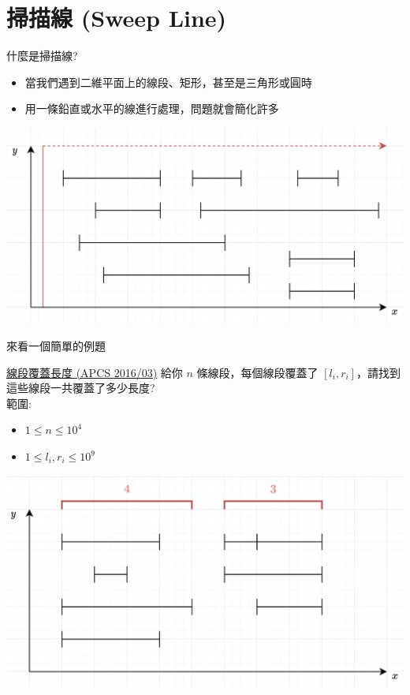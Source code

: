 \documentclass[aspectratio=169]{beamer}
\begin{document}
    \section{掃描線 (Sweep Line)}
    
    \begin{frame}{什麼是掃描線?}
        \begin{itemize}
            \item 當我們遇到二維平面上的線段、矩形，甚至是三角形或圓時
            \item 用一條鉛直或水平的線進行處理，問題就會簡化許多
        \end{itemize}
        \begin{center}
            \includegraphics[scale=0.4]{images/sweep_line.png}
        \end{center}
    \end{frame}
    
    \begin{frame}{來看一個簡單的例題}
        \begin{block}{\href{https://zerojudge.tw/ShowProblem?problemid=b966}{線段覆蓋長度 (APCS 2016/03)}}
            給你 $n$ 條線段，每個線段覆蓋了 $[l_i,r_i]$，請找到這些線段一共覆蓋了多少長度? \\
            \vspace{5mm}
            範圍:
            \begin{itemize}
                \item $1 \le n \le 10^4$
                \item $1 \le l_i,r_i \le 10^9$
            \end{itemize}
        \end{block}
        \begin{center}
            \includegraphics[scale=0.2]{images/segment_union_length.png}
        \end{center}
    \end{frame}
    
\end{document}
